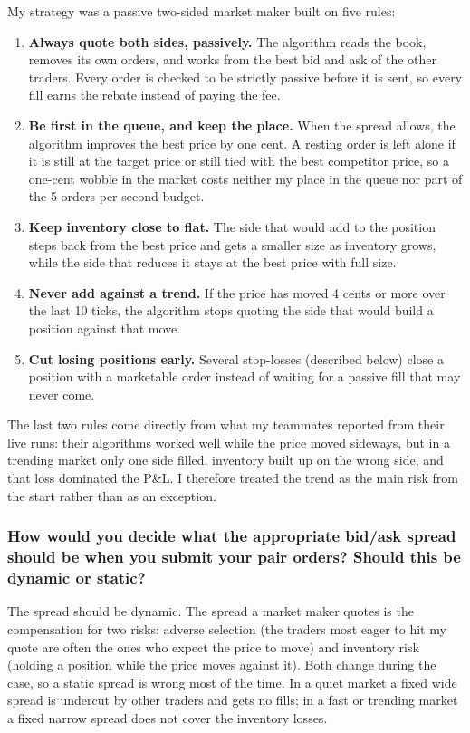 \documentclass{article}
\begin{document}
My strategy was a passive two-sided market maker built on five rules:
\begin{enumerate}
  \item \textbf{Always quote both sides, passively.} The algorithm reads the book, removes its own
        orders, and works from the best bid and ask of the other traders. Every order is checked to be
        strictly passive before it is sent, so every fill earns the rebate instead of paying the fee.
  \item \textbf{Be first in the queue, and keep the place.} When the spread allows, the algorithm improves
        the best price by one cent. A resting order is left alone if it is still at the target price or
        still tied with the best competitor price, so a one-cent wobble in the market costs neither my
        place in the queue nor part of the 5 orders per second budget.
  \item \textbf{Keep inventory close to flat.} The side that would add to the position steps back from
        the best price and gets a smaller size as inventory grows, while the side that reduces it stays at
        the best price with full size.
  \item \textbf{Never add against a trend.} If the price has moved 4 cents or more over the last 10 ticks,
        the algorithm stops quoting the side that would build a position against that move.
  \item \textbf{Cut losing positions early.} Several stop-losses (described below) close a position
        with a marketable order instead of waiting for a passive fill that may never come.
\end{enumerate}
The last two rules come directly from what my teammates reported from their live runs: their
algorithms worked well while the price moved sideways, but in a trending market only one side filled,
inventory built up on the wrong side, and that loss dominated the P\&L. I therefore treated the trend
as the main risk from the start rather than as an exception.

\subsubsection{How would you decide what the appropriate bid/ask spread should be when you submit
your pair orders? Should this be dynamic or static?}

The spread should be dynamic. The spread a market maker quotes is the compensation for two risks:
adverse selection (the traders most eager to hit my quote are often the ones who expect the price to
move) and inventory risk (holding a position while the price moves against it). Both change during the
case, so a static spread is wrong most of the time. In a quiet market a fixed wide spread is undercut
by other traders and gets no fills; in a fast or trending market a fixed narrow spread does not cover
the inventory losses.
\end{document}
